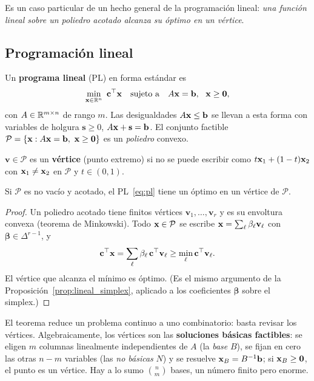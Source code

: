 Es un caso particular de un hecho general de la programación lineal: \emph{una función lineal sobre un
poliedro acotado alcanza su óptimo en un vértice}.

\subsection{Programación lineal}

Un \textbf{programa lineal} (PL) en forma estándar es
\begin{equation}
  \min_{\mathbf{x} \in \mathbb{R}^n}\ \mathbf{c}^\top\mathbf{x} \quad\text{sujeto a}\quad A\mathbf{x} = \mathbf{b},\ \ \mathbf{x} \ge \mathbf{0},
  \label{eq:pl}
\end{equation}
con $A \in \mathbb{R}^{m\times n}$ de rango $m$. Las desigualdades $A\mathbf{x} \le \mathbf{b}$ se llevan a esta forma con
variables de holgura $\mathbf{s} \ge 0$, $A\mathbf{x} + \mathbf{s} = \mathbf{b}$. El conjunto factible
$\mathcal{P} = \{\mathbf{x} : A\mathbf{x} = \mathbf{b},\ \mathbf{x} \ge \mathbf{0}\}$ es un \emph{poliedro} convexo.

\begin{definicion}
$\mathbf{v} \in \mathcal{P}$ es un \textbf{vértice} (punto extremo) si no se puede escribir como
$t\mathbf{x}_1 + (1-t)\mathbf{x}_2$ con $\mathbf{x}_1 \ne \mathbf{x}_2$ en $\mathcal{P}$ y $t \in (0,1)$.
\end{definicion}

\begin{teorema}
\label{teo:vertice}
Si $\mathcal{P}$ es no vacío y acotado, el PL~\eqref{eq:pl} tiene un óptimo en un vértice de $\mathcal{P}$.
\end{teorema}
\begin{proof}
Un poliedro acotado tiene finitos vértices $\mathbf{v}_1,\dots,\mathbf{v}_r$ y es su envoltura convexa (teorema de
Minkowski). Todo $\mathbf{x} \in \mathcal{P}$ se escribe $\mathbf{x} = \sum_\ell \beta_\ell\mathbf{v}_\ell$ con $\boldsymbol\beta \in \Delta^{r-1}$, y
\[
  \mathbf{c}^\top\mathbf{x} = \sum_\ell \beta_\ell\,\mathbf{c}^\top\mathbf{v}_\ell \ge \min_\ell \mathbf{c}^\top\mathbf{v}_\ell.
\]
El vértice que alcanza el mínimo es óptimo. (Es el mismo argumento de la Proposición~\ref{prop:lineal_simplex},
aplicado a los coeficientes $\boldsymbol\beta$ sobre el simplex.)
\end{proof}

El teorema reduce un problema continuo a uno combinatorio: basta revisar los vértices. Algebraicamente, los
vértices son las \textbf{soluciones básicas factibles}: se eligen $m$ columnas linealmente independientes de
$A$ (la \emph{base} $B$), se fijan en cero las otras $n - m$ variables (las \emph{no básicas} $N$) y se resuelve
$\mathbf{x}_B = B^{-1}\mathbf{b}$; si $\mathbf{x}_B \ge \mathbf{0}$, el punto es un vértice. Hay a lo sumo $\binom{n}{m}$ bases,
un número finito pero enorme.

